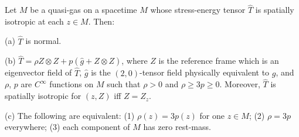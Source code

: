 Let $M$ be a quasi-gas on a spacetime $M$ whose stress-energy tensor $\hat{T}$ is spatially isotropic at each $z \in M$. Then:

(a) $\hat{T}$ is normal.

(b) $\hat{T} = \rho Z \otimes Z + p(\hat{g} + Z \otimes Z)$, where $Z$ is the reference frame which is an eigenvector field of $\hat{T}$, $\hat{g}$ is the $(2,0)$-tensor field physically equivalent to $g$, and $\rho$, $p$ are $C^\infty$ functions on $M$ such that $\rho > 0$ and $\rho \geq 3p \geq 0$. Moreover, $\hat{T}$ is spatially isotropic for $(z, Z)$ iff $Z = Z_z$.

(c) The following are equivalent:
(1) $\rho(z) = 3p(z)$ for one $z \in M$;
(2) $\rho = 3p$ everywhere;
(3) each component of $M$ has zero rest-mass.
